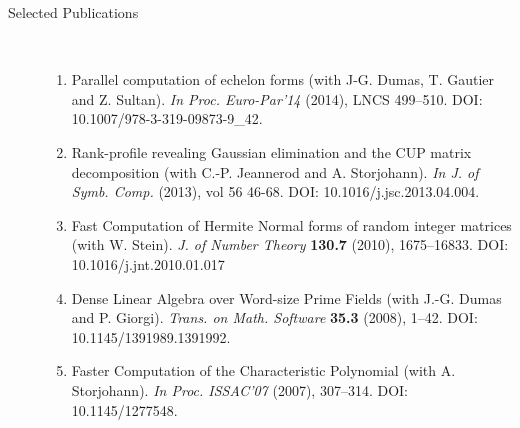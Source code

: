 \begin{description}
\item[Selected Publications]\ 
\medskip\noindent
\begin{enumerate}[1.]

\item Parallel computation of echelon forms (with J-G. Dumas, T. Gautier and Z. Sultan). 
\emph{In Proc. Euro-Par'14}  (2014),  LNCS 499--510. DOI: 10.1007/978-3-319-09873-9\_42.

\item Rank-profile revealing Gaussian elimination and the CUP matrix
  decomposition (with C.-P. Jeannerod and A. Storjohann). 
\emph{In J. of Symb. Comp.}  (2013),  vol 56 46-68. DOI: 10.1016/j.jsc.2013.04.004.

\item Fast Computation of Hermite Normal forms of random integer matrices (with
W. Stein).
\emph{J. of Number Theory} {\bf{130.7}} (2010), 1675--16833. DOI: 10.1016/j.jnt.2010.01.017

\item Dense Linear Algebra over Word-size Prime Fields (with J.-G. Dumas and P. Giorgi). 
\emph{Trans. on Math. Software} {\bf{35.3}} (2008), 1--42. DOI: 10.1145/1391989.1391992.

\item Faster Computation of the Characteristic Polynomial (with A. Storjohann). 
\emph{In Proc. ISSAC'07}  (2007), 307--314. DOI: 10.1145/1277548.

\end{enumerate}


\end{description}
